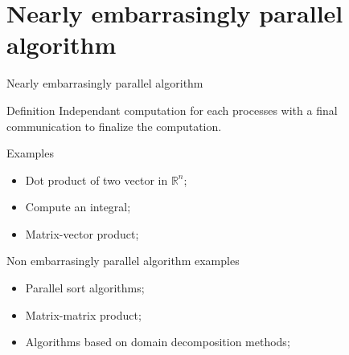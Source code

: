 \documentclass[compress,10pt,aspectratio=169]{beamer}
\begin{document}
\section{Nearly embarrasingly parallel algorithm}

\begin{frame}[fragile]{Nearly embarrasingly parallel algorithm}
    \scriptsize
    \begin{block}{\small Definition}
        Independant computation for each processes with a final communication to finalize the computation.
    \end{block}

    \begin{exampleblock}{\small Examples}
        \begin{itemize}
            \item Dot product of two vector in $\mathbb{R}^{n}$;
            \item Compute an integral;
            \item Matrix-vector product;
        \end{itemize}
    \end{exampleblock}

    \begin{alertblock}{\small Non embarrasingly parallel algorithm examples}
      \begin{itemize}
      \item Parallel sort algorithms;
      \item Matrix-matrix product;
      \item Algorithms based on domain decomposition methods;
      \end{itemize}
    \end{alertblock}
\end{frame}
\end{document}
